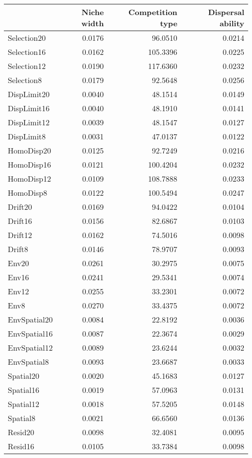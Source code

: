 \begin{longtable}{l|rrr}
\toprule
\multicolumn{1}{l}{} & Niche width & Competition type & Dispersal ability \\ 
\midrule
Selection20 & 0.0176 & 96.0510 & 0.0214 \\ 
Selection16 & 0.0162 & 105.3396 & 0.0225 \\ 
Selection12 & 0.0190 & 117.6360 & 0.0232 \\ 
Selection8 & 0.0179 & 92.5648 & 0.0256 \\ 
DispLimit20 & 0.0040 & 48.1514 & 0.0149 \\ 
DispLimit16 & 0.0040 & 48.1910 & 0.0141 \\ 
DispLimit12 & 0.0039 & 48.1547 & 0.0127 \\ 
DispLimit8 & 0.0031 & 47.0137 & 0.0122 \\ 
HomoDisp20 & 0.0125 & 92.7249 & 0.0216 \\ 
HomoDisp16 & 0.0121 & 100.4204 & 0.0232 \\ 
HomoDisp12 & 0.0109 & 108.7888 & 0.0233 \\ 
HomoDisp8 & 0.0122 & 100.5494 & 0.0247 \\ 
Drift20 & 0.0169 & 94.0422 & 0.0104 \\ 
Drift16 & 0.0156 & 82.6867 & 0.0103 \\ 
Drift12 & 0.0162 & 74.5016 & 0.0098 \\ 
Drift8 & 0.0146 & 78.9707 & 0.0093 \\ 
Env20 & 0.0261 & 30.2975 & 0.0075 \\ 
Env16 & 0.0241 & 29.5341 & 0.0074 \\ 
Env12 & 0.0255 & 33.2301 & 0.0072 \\ 
Env8 & 0.0270 & 33.4375 & 0.0072 \\ 
EnvSpatial20 & 0.0084 & 22.8192 & 0.0036 \\ 
EnvSpatial16 & 0.0087 & 22.3674 & 0.0029 \\ 
EnvSpatial12 & 0.0089 & 23.6244 & 0.0032 \\ 
EnvSpatial8 & 0.0093 & 23.6687 & 0.0033 \\ 
Spatial20 & 0.0020 & 45.1683 & 0.0127 \\ 
Spatial16 & 0.0019 & 57.0963 & 0.0131 \\ 
Spatial12 & 0.0018 & 57.5205 & 0.0148 \\ 
Spatial8 & 0.0021 & 66.6560 & 0.0136 \\ 
Resid20 & 0.0098 & 32.4081 & 0.0095 \\ 
Resid16 & 0.0105 & 33.7384 & 0.0098 \\ 

\end{longtable}
